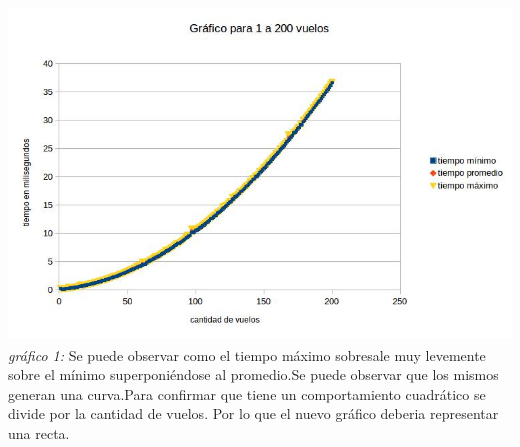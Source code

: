 \documentclass[a4paper]{article}
\begin{document}
\includegraphics[height=3.5in,height=3.5in,keepaspectratio
]{normal.jpg}\newline
\textit{gráfico 1:} Se puede observar como el tiempo máximo sobresale muy levemente sobre el mínimo superponiéndose al promedio.Se puede observar que los mismos generan una curva.Para confirmar que tiene un comportamiento cuadrático se divide por la cantidad de vuelos. Por lo que el nuevo gráfico deberia representar una recta. \newline
\end{document}
